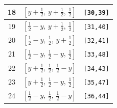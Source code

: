 \documentclass[fleqn,8pt]{jsarticle}
\begin{document}
\begin{longtable}{ccc}
18 & $\left[ y + \frac{1}{2},\, y + \frac{1}{2},\, \frac{1}{2} \right]$ & {\tt [30,39]} \\ \hline
19 & $\left[ \frac{1}{2} - y,\, y + \frac{1}{2},\, \frac{1}{2} \right]$ & {\tt [31,40]} \\ \hline
20 & $\left[ \frac{1}{2} - y,\, \frac{1}{2},\, y + \frac{1}{2} \right]$ & {\tt [32,41]} \\ \hline
21 & $\left[ \frac{1}{2} - y,\, \frac{1}{2} - y,\, \frac{1}{2} \right]$ & {\tt [33,48]} \\ \hline
22 & $\left[ y + \frac{1}{2},\, \frac{1}{2},\, \frac{1}{2} - y \right]$ & {\tt [34,43]} \\ \hline
23 & $\left[ y + \frac{1}{2},\, \frac{1}{2} - y,\, \frac{1}{2} \right]$ & {\tt [35,47]} \\ \hline
24 & $\left[ \frac{1}{2} - y,\, \frac{1}{2},\, \frac{1}{2} - y \right]$ & {\tt [36,44]} \\
\end{longtable}
\renewcommand{\arraystretch}{1.2}
\end{document}
